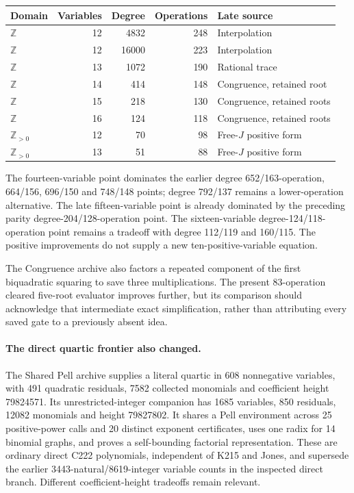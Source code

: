 \begin{center}
\small
\begin{tabular}{lrrrl}
Domain & Variables & Degree & Operations & Late source\\ \hline
$\mathbb Z$ & 12 & 4832 & 248 & Interpolation\\
$\mathbb Z$ & 12 & 16000 & 223 & Interpolation\\
$\mathbb Z$ & 13 & 1072 & 190 & Rational trace\\
$\mathbb Z$ & 14 & 414 & 148 & Congruence, retained root\\
$\mathbb Z$ & 15 & 218 & 130 & Congruence, retained roots\\
$\mathbb Z$ & 16 & 124 & 118 & Congruence, retained roots\\
$\mathbb Z_{>0}$ & 12 & 70 & 98 & Free-$J$ positive form\\
$\mathbb Z_{>0}$ & 13 & 51 & 88 & Free-$J$ positive form\\
\end{tabular}
\end{center}

The fourteen-variable point dominates the earlier degree
652/163-operation, 664/156, 696/150 and 748/148 points; degree
792/137 remains a lower-operation alternative.  The late
fifteen-variable point is already dominated by the preceding
parity degree-204/128-operation point.  The sixteen-variable
degree-124/118-operation point remains a tradeoff with degree
112/119 and 160/115.  The positive improvements do not supply a
new ten-positive-variable equation.

The Congruence archive also factors a repeated component of the first
biquadratic squaring to save three multiplications.  The present
83-operation cleared five-root evaluator improves further, but its
comparison should acknowledge that intermediate exact simplification,
rather than attributing every saved gate to a previously absent idea.

\paragraph{The direct quartic frontier also changed.}
The Shared Pell archive supplies a literal quartic in 608 nonnegative
variables, with 491 quadratic residuals, 7582 collected monomials and
coefficient height 79824571.  Its unrestricted-integer companion has
1685 variables, 850 residuals, 12082 monomials and height 79827802.
It shares a Pell environment across 25 positive-power calls and
20 distinct exponent certificates, uses one radix for 14 binomial
graphs, and proves a self-bounding factorial representation.
These are ordinary direct C222 polynomials, independent of K215 and
Jones, and supersede the earlier 3443-natural/8619-integer variable
counts in the inspected direct branch.  Different coefficient-height
tradeoffs remain relevant.

